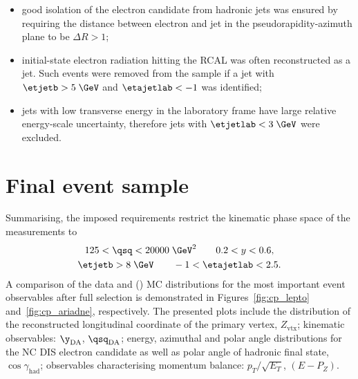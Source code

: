 \begin{itemize}
	\item good isolation of the electron candidate from hadronic jets was ensured by requiring the distance between electron and jet in the pseudorapidity-azimuth plane to be $\Delta R > 1$;
	\item initial-state electron radiation hitting the RCAL was often reconstructed as a jet. Such events were removed from the sample if a jet with $\etjetb > 5\;\GeV$ and $\etajetlab < -1$ was identified;
	\item jets with low transverse energy in the laboratory frame have large relative energy-scale uncertainty, therefore jets with $\etjetlab < 3\;\GeV$ were excluded.
\end{itemize}

\section{Final event sample}
\label{sec:eventsampletab}
Summarising, the imposed requirements restrict the kinematic phase space of the measurements to
\begin{gather}
125 < \qsq < 20000\;\GeV^2 \qquad 0.2 < y < 0.6, \label{eq:kinematicphasespacecuts}\\
\etjetb > 8\;\GeV \qquad -1 < \etajetlab < 2.5. \label{eq:jetphasespacecuts}
\end{gather}
A comparison of the data and \ariadne (\lepto) MC distributions for the most important event observables after full selection is demonstrated in Figures~\ref{fig:cp_lepto} and~\ref{fig:cp_ariadne}, respectively. The presented plots include the distribution of the reconstructed longitudinal coordinate of the primary vertex, $Z_\text{vtx}$; kinematic observables: $\y_\text{DA}$, $\qsq_\text{DA}$; energy, azimuthal and polar angle distributions for the NC DIS electron candidate as well as polar angle of hadronic final state, $\cos{\gamma_\text{had}}$; observables characterising momentum balance: $p_T/\sqrt{E_T}$, $\left(E-P_Z\right)$. 

